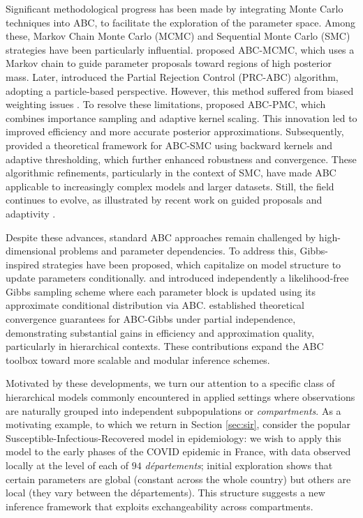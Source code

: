 \documentclass[11pt,a4paper]{article}
\theoremstyle{plain}
\theoremstyle{definition}
\theoremstyle{remark}
\begin{document}
Significant methodological progress has been made by integrating Monte Carlo techniques into ABC, to facilitate the exploration of the parameter space. Among these, Markov Chain Monte Carlo (MCMC) and Sequential Monte Carlo (SMC) strategies have been particularly influential. \citet{marjoramMarkovChainMonte2003a} proposed ABC-MCMC, which uses a Markov chain to guide parameter proposals toward regions of high posterior mass. Later, \citet{sisson2007sequential} introduced the Partial Rejection Control (PRC-ABC) algorithm, adopting a particle-based perspective. However, this method suffered from biased weighting issues \citep{sissonCorrectionSissonSequential2009}. 
To resolve these limitations, \citet{beaumontAdaptiveApproximateBayesian2009b} proposed ABC-PMC, which combines importance sampling and adaptive kernel scaling. This innovation led to improved efficiency and more accurate posterior approximations. Subsequently, \citet{delmoralAdaptiveSequentialMonte2012} provided a theoretical framework for ABC-SMC using backward kernels and adaptive thresholding, which further enhanced robustness and convergence. These algorithmic refinements, particularly in the context of SMC, have made ABC applicable to increasingly complex models and larger datasets. Still, the field continues to evolve, as illustrated by recent work on guided proposals and adaptivity \citep{picchini2024guided}.

Despite these advances, standard ABC approaches remain challenged by high-dimensional problems and parameter dependencies. To address this, Gibbs-inspired strategies have been proposed, which capitalize on model structure to update parameters conditionally. \citet{clarte2021componentwise} and \citet{rodrigues2020likelihood} introduced independently a likelihood-free Gibbs sampling scheme where each parameter block is updated using its approximate conditional distribution via ABC. 
\citet{clarte2021componentwise} established theoretical convergence guarantees for ABC-Gibbs under partial independence, demonstrating substantial gains in efficiency and approximation quality, particularly in hierarchical contexts. These contributions expand the ABC toolbox toward more scalable and modular inference schemes.

Motivated by these developments, we turn our attention to a specific class of hierarchical models commonly encountered in applied settings where observations are naturally grouped into independent subpopulations or \emph{compartments}. 
As a motivating example, to which we return in Section \ref{sec:sir}, consider the popular Susceptible-Infectious-Recovered model in epidemiology: we wish to apply this model to the early phases of the COVID epidemic in France, with data observed locally at the level of each of $94$ \emph{d\'epartements}; initial exploration shows that certain parameters are global (constant across the whole country) but others are local (they vary between the départements).   
This structure suggests a new inference framework that exploits exchangeability across compartments.
\end{document}
